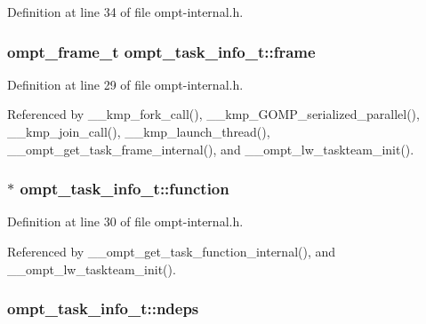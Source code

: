 Definition at line 34 of file ompt-\/internal.\-h.

\hypertarget{structompt__task__info__t_ab4b3a1c10b649c40015c133ea25fc3ae}{
\subsubsection[{frame}]{\setlength{\rightskip}{0pt plus 5cm}ompt\-\_\-frame\-\_\-t ompt\-\_\-task\-\_\-info\-\_\-t\-::frame}}\label{structompt__task__info__t_ab4b3a1c10b649c40015c133ea25fc3ae}


Definition at line 29 of file ompt-\/internal.\-h.



Referenced by \-\_\-\-\_\-kmp\-\_\-fork\-\_\-call(), \-\_\-\-\_\-kmp\-\_\-\-G\-O\-M\-P\-\_\-serialized\-\_\-parallel(), \-\_\-\-\_\-kmp\-\_\-join\-\_\-call(), \-\_\-\-\_\-kmp\-\_\-launch\-\_\-thread(), \-\_\-\-\_\-ompt\-\_\-get\-\_\-task\-\_\-frame\-\_\-internal(), and \-\_\-\-\_\-ompt\-\_\-lw\-\_\-taskteam\-\_\-init().

\hypertarget{structompt__task__info__t_ac4cc016e1565bdd8732975f81facfe47}{
\subsubsection[{function}]{$\ast$ ompt\-\_\-task\-\_\-info\-\_\-t\-::function}}\label{structompt__task__info__t_ac4cc016e1565bdd8732975f81facfe47}


Definition at line 30 of file ompt-\/internal.\-h.



Referenced by \-\_\-\-\_\-ompt\-\_\-get\-\_\-task\-\_\-function\-\_\-internal(), and \-\_\-\-\_\-ompt\-\_\-lw\-\_\-taskteam\-\_\-init().

\hypertarget{structompt__task__info__t_a2d1aa12c03c567b5f34133ef134751b6}{
\subsubsection[{ndeps}]{ ompt\-\_\-task\-\_\-info\-\_\-t\-::ndeps}}\label{structompt__task__info__t_a2d1aa12c03c567b5f34133ef134751b6}



